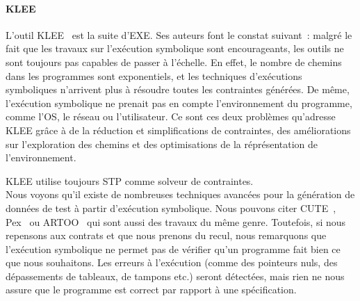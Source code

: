 \paragraph{KLEE} L'outil KLEE~ est la suite d'EXE. Ses auteurs
font le constat suivant~: malgré le fait que les travaux sur l'exécution
symbolique sont encourageants, les outils ne sont toujours pas capables de
passer à l'échelle. En effet, le nombre de chemins dans les programmes sont
exponentiels, et les techniques d'exécutions symboliques n'arrivent plus à
résoudre toutes les contraintes générées. De même, l'exécution symbolique ne
prenait pas en compte l'environnement du programme, comme l'OS, le réseau ou
l'utilisateur. Ce sont ces deux problèmes qu'adresse KLEE grâce à de la
réduction et simplifications de contraintes, des améliorations sur l'exploration
des chemins et des optimisations de la réprésentation de l'environnement.

KLEE utilise toujours STP comme solveur de contraintes. \\

Nous voyons qu'il existe de nombreuses techniques avancées pour la génération de
données de test à partir d'exécution symbolique. Nous pouvons citer
CUTE~, Pex~ ou ARTOO~ qui
sont aussi des travaux du même genre. Toutefois, si nous repensons aux contrats
et que nous prenons du recul, nous remarquons que l'exécution symbolique ne
permet pas de vérifier qu'un programme fait bien ce que nous souhaitons. Les
erreurs à l'exécution (comme des pointeurs nuls, des dépassements de tableaux,
de tampons etc.) seront détectées, mais rien ne nous assure que le programme est
correct par rapport à une spécification.
